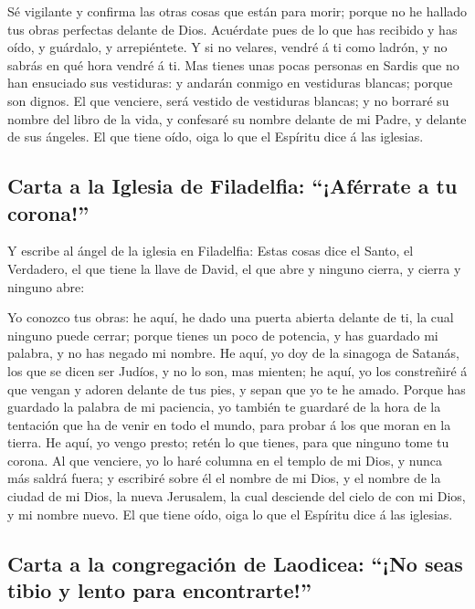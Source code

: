  Sé vigilante y confirma las otras cosas que están para
morir; porque no he hallado tus obras perfectas delante de Dios.
 Acuérdate pues de lo que has recibido y has oído, y
guárdalo, y arrepiéntete. Y si no velares, vendré á ti como ladrón, y no
sabrás en qué hora vendré á ti.  Mas tienes unas pocas
personas en Sardis que no han ensuciado sus vestiduras: y andarán
conmigo en vestiduras blancas; porque son dignos.  El que
venciere, será vestido de vestiduras blancas; y no borraré su nombre del
libro de la vida, y confesaré su nombre delante de mi Padre, y delante
de sus ángeles.  El que tiene oído, oiga lo que el
Espíritu dice á las iglesias.

\hypertarget{carta-a-la-iglesia-de-filadelfia-afuxe9rrate-a-tu-corona}{%
\subsection{Carta a la Iglesia de Filadelfia: ``¡Aférrate a tu
corona!''}\label{carta-a-la-iglesia-de-filadelfia-afuxe9rrate-a-tu-corona}}

 Y escribe al ángel de la iglesia en Filadelfia: Estas
cosas dice el Santo, el Verdadero, el que tiene la llave de David, el
que abre y ninguno cierra, y cierra y ninguno abre:

 Yo conozco tus obras: he aquí, he dado una puerta abierta
delante de ti, la cual ninguno puede cerrar; porque tienes un poco de
potencia, y has guardado mi palabra, y no has negado mi nombre.
 He aquí, yo doy de la sinagoga de Satanás, los que se
dicen ser Judíos, y no lo son, mas mienten; he aquí, yo los constreñiré
á que vengan y adoren delante de tus pies, y sepan que yo te he amado.
 Porque has guardado la palabra de mi paciencia, yo
también te guardaré de la hora de la tentación que ha de venir en todo
el mundo, para probar á los que moran en la tierra.  He
aquí, yo vengo presto; retén lo que tienes, para que ninguno tome tu
corona.  Al que venciere, yo lo haré columna en el templo
de mi Dios, y nunca más saldrá fuera; y escribiré sobre él el nombre de
mi Dios, y el nombre de la ciudad de mi Dios, la nueva Jerusalem, la
cual desciende del cielo de con mi Dios, y mi nombre nuevo.
 El que tiene oído, oiga lo que el Espíritu dice á las
iglesias.

\hypertarget{carta-a-la-congregaciuxf3n-de-laodicea-no-seas-tibio-y-lento-para-encontrarte}{%
\subsection{Carta a la congregación de Laodicea: ``¡No seas tibio y
lento para
encontrarte!''}\label{carta-a-la-congregaciuxf3n-de-laodicea-no-seas-tibio-y-lento-para-encontrarte}}

